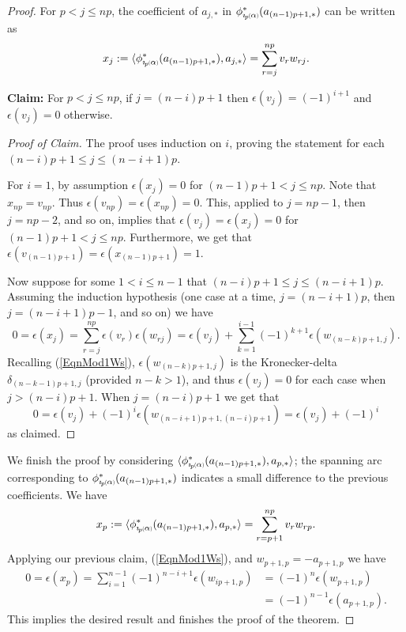 \documentclass[11pt]{amsart}
\newcommand*{\subsmallp}[1]{\scalebox{.5}{\ensuremath#1}}
\newcommand{\subpp}[2][p]{\imath_{\hspace*{-1pt}#1}\hspace*{-.5pt}\subsmallp(#2\subsmallp)}
\theoremstyle{definition}
\begin{document}
\begin{proof}
For $p<j\le np$, the coefficient of $a_{j,\ast}$ in $\phi^\ast_{\subpp\alpha}(a_{(n-1)p+1,\ast})$ can be written as
      \begin{equation}x_j := \langle \phi^{\ast}_{\subpp\alpha}(a_{(n-1)p+1,\ast}), a_{j,\ast} \rangle = \sum_{r=j}^{np}v_rw_{rj}.
      \label{eqnCurveExpansion}
      \end{equation}

{\bf Claim:} For $p < j \le np$, if $j=(n-i)p+1$ then $\epsilon(v_j)=(-1)^{i+1}$ and $\epsilon(v_j)=0$ otherwise.
\begin{proof}[Proof of Claim] The proof uses induction on $i$, proving the statement for each $(n-i)p+1\le j\le (n-i+1)p$. 

For $i=1$, by assumption $\epsilon(x_j)=0$ for $(n-1)p+1<j\le np$. Note that $x_{np} = v_{np}$. Thus $\epsilon(v_{np})=\epsilon(x_{np}) = 0$. This, applied to $j=np-1$, then $j=np-2$, and so on, implies that $\epsilon(v_j) = \epsilon(x_j) = 0$ for $(n-1)p+1<j\le np$. Furthermore, we get that $\epsilon(v_{(n-1)p+1}) = \epsilon(x_{(n-1)p+1}) = 1$.

Now suppose for some $1<i\le n-1$ that $(n-i)p+1\le j \le (n-i+1)p$. Assuming the induction hypothesis (one case at a time, $j=(n-i+1)p$, then $j=(n-i+1)p-1$, and so on) we have
      \[0 = \epsilon(x_j) = \sum_{r=j}^{np}\epsilon(v_r)\epsilon(w_{rj}) = \epsilon(v_j) + \sum_{k=1}^{i-1}(-1)^{k+1}\epsilon(w_{(n-k)p+1,j}).\]
Recalling (\ref{EqnMod1Ws}), $\epsilon(w_{(n-k)p+1,j})$ is the Kronecker-delta $\delta_{(n-k-1)p+1,j}$ (provided $n-k>1$), and thus $\epsilon(v_j) = 0$ for each case when $j>(n-i)p+1$. When $j=(n-i)p+1$ we get that 
      \[0 = \epsilon(v_j) + (-1)^{i}\epsilon(w_{(n-i+1)p+1,(n-i)p+1}) = \epsilon(v_j) + (-1)^{i}\]
as claimed.
\end{proof}

We finish the proof by considering $\langle \phi^{\ast}_{\subpp\alpha}(a_{(n-1)p+1,\ast}), a_{p,\ast} \rangle$; the spanning arc corresponding to $\phi^{\ast}_{\subpp\alpha}(a_{(n-1)p+1,\ast})$ indicates a small difference to the previous coefficients. We have
      \[x_p := \langle \phi^{\ast}_{\subpp\alpha}(a_{(n-1)p+1,\ast}), a_{p,\ast} \rangle = \sum_{r=p+1}^{np}v_rw_{rp}.\]
Applying our previous claim, (\ref{EqnMod1Ws}), and $w_{p+1,p}=-a_{p+1,p}$ we have
        \begin{align*}
        0 = \epsilon(x_p)   = \sum_{i=1}^{n-1}(-1)^{n-i+1}\epsilon(w_{ip+1,p})  &= (-1)^n\epsilon(w_{p+1,p})\\
                                                                                &= (-1)^{n-1}\epsilon(a_{p+1,p}).
        \end{align*}
This implies the desired result and finishes the proof of the theorem.

\end{proof}
\end{document}
